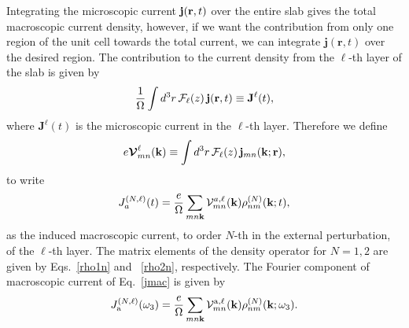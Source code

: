 \documentclass[floatfix,prb,aps,superscriptaddress,11pt,preprint]{revtex4}
\begin{document}
Integrating the microscopic current $\mathbf{j}(\mathbf{r},t)$ over
the entire slab gives the total macroscopic current density, 
 however, if we want the
contribution from only one region of the unit cell towards the total
current, we can integrate $\mathbf{j}({\mathbf r},t)$ over the
desired region. The contribution to the current density from the
$\ell$-th layer of the slab is given by
\begin{equation}\label{jsz}
\frac{1}{\Omega}\int d^3r\, {\mathbf{\cal F}}_\ell(z)\, \mathbf{j}(\mathbf{r},t)
 \equiv \mathbf{J}^{\ell}(t),
\end{equation}
where $\mathbf{J}^{\ell}(t)$ is the microscopic current  in the
$\ell$-th layer.
Therefore we define
\begin{equation}\label{vcal}
e{\boldsymbol{\mathcal{V}}}^{\ell}_{mn}(\mathbf{k})
\equiv
\int d^3r\, {\mathbf{\cal F}}_\ell(z)\,\mathbf{j}_{mn}({\mathbf{k}};\mathbf{r}),
\end{equation}
to write
\begin{equation}\label{jmac}
J_a^{(N,\ell)}(t)=\frac{e}{\Omega}
\sum_{mn\mathbf{k}}
\mathcal{V}^{a,\ell}_{mn}(\mathbf{k})
\rho^{(N)}_{nm}(\mathbf{k};t),
\end{equation}
as the induced macroscopic current, to order $N$-th in the external
perturbation, of the  $\ell$-th layer. The matrix elements of the
density operator for $N=1,2$ are given by Eqs.~\eqref{rho1n} and
~\eqref{rho2n}, respectively. 
The Fourier component of macroscopic current of Eq.~\eqref{jmac} is given by
\begin{equation}\label{jmac2}
J_{\mathrm{a}}^{(N,\ell)}(\omega_3)=\frac{e}{\Omega}
\sum_{mn\mathbf{k}}
{\mathbf{\cal V}}^{\mathrm{a},\ell}_{mn}(\mathbf{k})
\rho^{(N)}_{nm}(\mathbf{k};\omega_3)
.
\end{equation}
\end{document}
